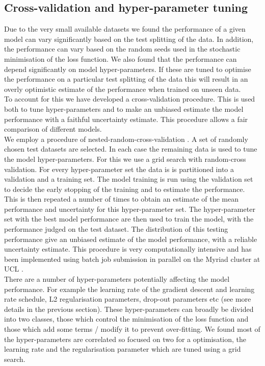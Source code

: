 \documentclass[NOTE, disdraft=true, UKenglish]{\DISCDTLATEXPATH UCLCDTDISdoc}
\begin{document}
\subsection{Cross-validation and hyper-parameter tuning}
Due to the very small available datasets we found the performance of a given model can vary significantly based on the test splitting of the data. In addition, the performance can vary based on the random seeds used in the stochastic minimisation of the loss function. We also found that the performance can depend significantly on model hyper-parameters. If these are tuned to optimise the performance on a particular test splitting of the data this will result in an overly optimistic estimate of the performance when trained on unseen data.
\\ \indent To account for this we have developed a cross-validation procedure. This is used both to tune hyper-parameters and to make an unbiased estimate the model performance with a faithful uncertainty estimate. This procedure allows a fair comparison of different models.
\\ \indent We employ a procedure of nested-random-cross-validation \cite{cross_validate}.
A set of randomly chosen test datasets  are selected. In each case the remaining data is used to tune the model hyper-parameters. For this we use a grid search with random-cross validation. For every hyper-parameter set the data is is partitioned into a validation and a training set. The model training is run using the validation set to decide the early stopping of the training and to estimate the performance. This is then repeated a number of times to obtain an estimate of the mean performance and uncertainty for this hyper-parameter set. The hyper-parameter set with the best model performance are then used to train the model, with the performance judged on the test dataset. The distribution of this testing performance give an unbiased estimate of the model performance, with a reliable uncertainty estimate. This procedure is very computationally intensive and has been implemented using batch job submission in parallel on the Myriad cluster at UCL \cite{myriad}.
\\ \indent There are a number of hyper-parameters potentially affecting the model performance. For example the learning rate of the gradient descent and learning rate schedule, L2 regularisation parameters, drop-out parameters etc (see more details in the previous section). 
These hyper-parameters can broadly be divided into two classes, those which control the minimisation of the loss function and those which add some terms / modify it to prevent over-fitting. We found most of the hyper-parameters are correlated so focused on two for a optimisation, the learning rate and the regularisation parameter which are tuned using a grid search.  
\end{document}
